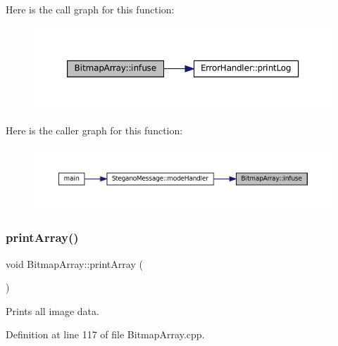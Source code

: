 Here is the call graph for this function\+:
\nopagebreak
\begin{figure}[H]
\begin{center}
\leavevmode
\includegraphics[width=350pt]{classBitmapArray_afb549703b79c26499fc443f187bb3d6a_cgraph}
\end{center}
\end{figure}
Here is the caller graph for this function\+:
\nopagebreak
\begin{figure}[H]
\begin{center}
\leavevmode
\includegraphics[width=350pt]{classBitmapArray_afb549703b79c26499fc443f187bb3d6a_icgraph}
\end{center}
\end{figure}
\mbox{\label{classBitmapArray_a0580ddeedca7f59fd8d43ec92e6bb4a1}} 
\subsubsection{\texorpdfstring{printArray()}{printArray()}\hspace{0.1cm}{\footnotesize\ttfamily [1/2]}}
{\footnotesize\ttfamily void Bitmap\+Array\+::print\+Array (\begin{DoxyParamCaption}{ }\end{DoxyParamCaption})}



Prints all image data. 



Definition at line 117 of file Bitmap\+Array.\+cpp.

